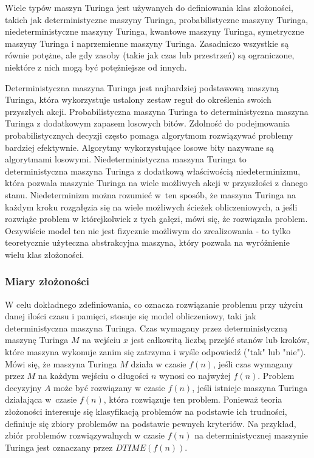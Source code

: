 Wiele typów maszyn Turinga jest używanych do definiowania klas złożoności, takich jak deterministyczne maszyny Turinga, probabilistyczne maszyny Turinga, niedeterministyczne maszyny Turinga, kwantowe maszyny Turinga, symetryczne maszyny Turinga i naprzemienne maszyny Turinga. Zasadniczo wszystkie są równie potężne, ale gdy zasoby (takie jak czas lub przestrzeń) są ograniczone, niektóre z nich mogą być potężniejsze od innych.

Deterministyczna maszyna Turinga jest najbardziej podstawową maszyną Turinga, która wykorzystuje ustalony zestaw reguł do określenia swoich przyszłych akcji. Probabilistyczna maszyna Turinga to deterministyczna maszyna Turinga z dodatkowym zapasem losowych bitów. Zdolność do podejmowania probabilistycznych decyzji często pomaga algorytmom rozwiązywać problemy bardziej efektywnie. Algorytmy wykorzystujące losowe bity nazywane są algorytmami losowymi. Niedeterministyczna maszyna Turinga to deterministyczna maszyna Turinga z dodatkową właściwością niedeterminizmu, która pozwala maszynie Turinga na wiele możliwych akcji w przyszłości z danego stanu. Niedeterminizm można rozumieć w~ten sposób, że maszyna Turinga na każdym kroku rozgałęzia się na wiele możliwych ścieżek obliczeniowych, a jeśli rozwiąże problem w którejkolwiek z tych gałęzi, mówi się, że rozwiązała problem. Oczywiście model ten nie jest fizycznie możliwym do zrealizowania - to tylko teoretycznie użyteczna abstrakcyjna maszyna, który pozwala na wyróżnienie wielu klas złożoności. 

\subsubsection{Miary złożoności}
W celu dokładnego zdefiniowania, co oznacza rozwiązanie problemu przy użyciu danej ilości czasu i pamięci, stosuje się model obliczeniowy, taki jak deterministyczna maszyna Turinga. Czas wymagany przez deterministyczną maszynę Turinga $M$ na wejściu $x$ jest całkowitą liczbą przejść stanów lub kroków, które maszyna wykonuje zanim się zatrzyma i wyśle odpowiedź ("tak" lub "nie"). Mówi się, że maszyna Turinga $M$ działa w czasie $f(n)$, jeśli czas wymagany przez $M$ na każdym wejściu o długości $n$ wynosi co najwyżej $f(n)$. Problem decyzyjny $A$ może być rozwiązany w czasie $f(n)$, jeśli istnieje maszyna Turinga działająca w~czasie $f(n)$, która rozwiązuje ten problem. Ponieważ teoria złożoności interesuje się klasyfikacją problemów na podstawie ich trudności, definiuje się zbiory problemów na podstawie pewnych kryteriów. Na przykład, zbiór problemów rozwiązywalnych w czasie $f(n)$ na deterministycznej maszynie Turinga jest oznaczany przez $DTIME(f(n))$.


